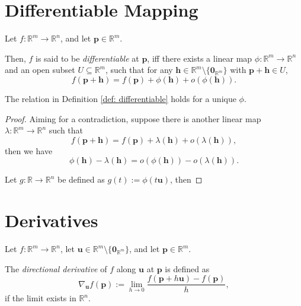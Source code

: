 


\section{Differentiable Mapping}


\begin{definition}
	\label{def: differentiable}
	Let $f: \mathbb R^m \to \mathbb R^n$, and let $\mathbf p \in \mathbb R^m$.
	
	Then, $f$ is said to be \textit{differentiable} at $\mathbf p$,  iff there exists a linear map $\phi: \mathbb R^m \to \mathbb R^n$ and an open subset $U \subseteq \mathbb R^m$, such that for any $\mathbf h \in \mathbb R^m \setminus \{\mathbf 0_{\mathbb R^m}\}$ with $\mathbf p + \mathbf h \in U$,
	$$
	f(\mathbf p + \mathbf h) = f(\mathbf p) + \phi(\mathbf h) + o(\phi(\mathbf h)).
	$$
\end{definition}


\begin{lemma}
	The relation in Definition \ref{def: differentiable} holds for a unique $\phi$.

	\begin{proof}
		Aiming for a contradiction, suppose there is another linear map $\lambda: \mathbb R^m \to \mathbb R^n$ such that
		$$
		f(\mathbf p + \mathbf h) = f(\mathbf p) + \lambda(\mathbf h) + o(\lambda(\mathbf h)),
		$$
		then we have
		$$
		\phi(\mathbf h) - \lambda(\mathbf h) = o(\phi(\mathbf h)) - o(\lambda(\mathbf h)).
		$$
		
		Let $g: \mathbb R \to \mathbb R^n$ be defined as $g(t) := \phi(t\mathbf u)$, then
	\end{proof}
\end{lemma}





\section{Derivatives}


\begin{definition}
	\label{def: directional derivatives}
	Let $f: \mathbb R^m \to \mathbb R^n$, let $\mathbf u \in \mathbb R^m \setminus \{\mathbf 0_{\mathbb R^m}\}$, and let $\mathbf p \in \mathbb R^m$.
	
	The \textit{directional derivative} of $f$ along $\mathbf u$ at $\mathbf p$ is defined as
	$$
	\nabla_{\mathbf u} f(\mathbf p) := \lim_{h \to 0} \frac{f(\mathbf p + h\mathbf u) - f(\mathbf p)}{h},
	$$
	if the limit exists in $\mathbb R^n$.
\end{definition}


